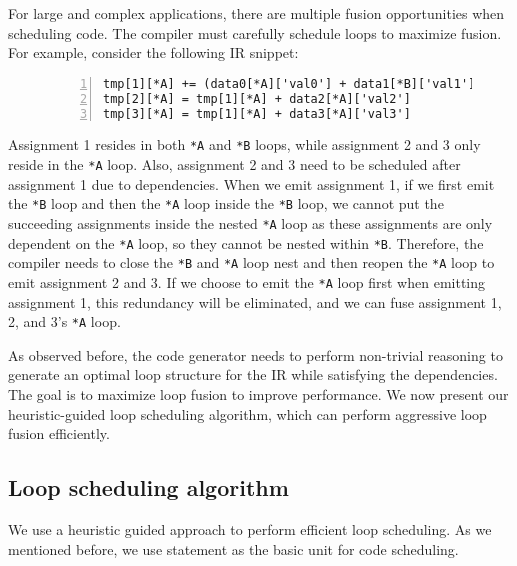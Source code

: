\documentclass[sigplan, nonacm]{acmart}\settopmatter{printfolios=true,printccs=false,printacmref=false}
\begin{document}
For large and complex applications, there are multiple fusion opportunities when scheduling code. The compiler must carefully schedule loops to maximize fusion. For example, consider the following IR snippet:\par
\begin{figure}[H]
\begin{lstlisting}[numbers=left]
tmp[1][*A] += (data0[*A]['val0'] + data1[*B]['val1'])
tmp[2][*A] = tmp[1][*A] + data2[*A]['val2']
tmp[3][*A] = tmp[1][*A] + data3[*A]['val3']
\end{lstlisting}
\caption{}
\label{loopheu}
\end{figure}
Assignment 1 resides in both \texttt{*A} and \texttt{*B} loops, while assignment 2 and 3 only reside in the \texttt{*A} loop. Also, assignment 2 and 3 need to be scheduled after assignment 1 due to dependencies. When we emit assignment 1, if we first emit the \texttt{*B} loop and then the \texttt{*A} loop inside the \texttt{*B} loop, we cannot put the succeeding assignments inside the nested \texttt{*A} loop as these assignments are only dependent on the \texttt{*A} loop, so they cannot be nested within \texttt{*B}. Therefore, the compiler needs to close the \texttt{*B} and \texttt{*A} loop nest and then reopen the \texttt{*A} loop to emit assignment 2 and 3. If we choose to emit the \texttt{*A} loop first when emitting assignment 1, this redundancy will be eliminated, and we can fuse assignment 1, 2, and 3's \texttt{*A} loop.

As observed before, the code generator needs to perform non-trivial reasoning to generate an optimal loop structure for the IR while satisfying the dependencies. The goal is to maximize loop fusion to improve performance. We now present our heuristic-guided loop scheduling algorithm, which can perform aggressive loop fusion efficiently.
\subsection*{Loop scheduling algorithm}
\iffalse
We use a heuristic guided approach to perform efficient loop scheduling. As we mentioned before, we use statement as the basic unit for code scheduling. \par
\end{document}
